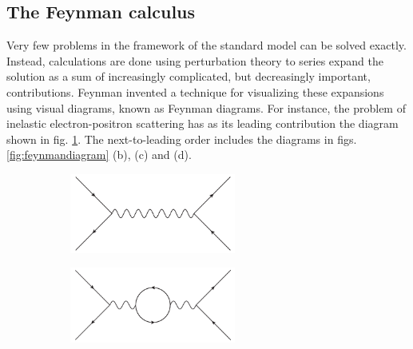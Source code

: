 \documentclass[twoside,english]{uiofysmaster}
\begin{document}
\subsection{The Feynman calculus}
Very few problems in the framework of the standard model can be solved exactly. Instead, calculations are done using perturbation theory to series expand the solution as a sum of increasingly complicated, but decreasingly important, contributions. Feynman invented a technique for visualizing these expansions using visual diagrams, known as Feynman diagrams. For instance, the problem of inelastic electron-positron scattering has as its leading contribution the diagram shown in fig. \ref{fig:feynmandiagram_a}. The next-to-leading order includes the diagrams in figs. \ref{fig:feynmandiagram} (b), (c) and (d).
\begin{figure}[htbp]
	\centering
	\begin{subfigure}[b]{0.45\textwidth}
		\centering
		\includegraphics[width=0.6\textwidth]{figures/susyintro/epscattering.pdf}
		\caption{ }
		\label{fig:feynmandiagram_a}
	\end{subfigure}
	\begin{subfigure}[b]{0.45\textwidth}
		\centering
		\includegraphics[width=0.6\textwidth]{figures/susyintro/epscattering_fermionloop.pdf}
		\caption{ }
		\label{fig:feynmandiagram_b}
	\end{subfigure}


\end{figure}
\end{document}
